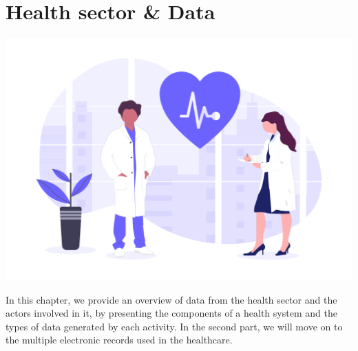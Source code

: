 \chapter{Health sector \& Data}

		




\label{chapitre2}
		
		\includegraphics [width=1 \linewidth, height=0.8\textheight, keepaspectratio] {images/chaptersFigures/health.png}
		
	
		
    \newpage
    \thispagestyle{plain}

In this chapter, we provide an overview of data from the health sector and the actors involved in it, by presenting the components of a health system and the types of data generated by each activity. In the second part, we will move on to the multiple electronic records used in the healthcare.


